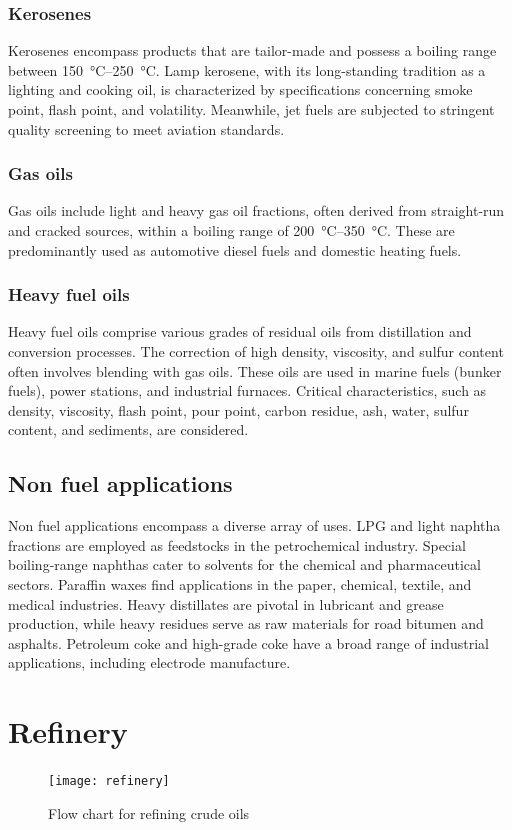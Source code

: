 \subsubsection{Kerosenes}
Kerosenes encompass products that are tailor-made and possess a boiling range between \SIrange{150}{250}{\celsius}.
Lamp kerosene, with its long-standing tradition as a lighting and cooking oil, is characterized by specifications concerning smoke point, flash point, and volatility.
Meanwhile, jet fuels are subjected to stringent quality screening to meet aviation standards.

\subsubsection{Gas oils}
Gas oils include light and heavy gas oil fractions, often derived from straight-run and cracked sources, within a boiling range of \SIrange{200}{350}{\celsius}.
These are predominantly used as automotive diesel fuels and domestic heating fuels.

\subsubsection{Heavy fuel oils}
Heavy fuel oils comprise various grades of residual oils from distillation and conversion processes.
The correction of high density, viscosity, and sulfur content often involves blending with gas oils.
These oils are used in marine fuels (bunker fuels), power stations, and industrial furnaces.
Critical characteristics, such as density, viscosity, flash point, pour point, carbon residue, ash, water, sulfur content, and sediments, are considered.

\subsection{Non fuel applications}
Non fuel applications encompass a diverse array of uses.
LPG and light naphtha fractions are employed as feedstocks in the petrochemical industry.
Special boiling-range naphthas cater to solvents for the chemical and pharmaceutical sectors.
Paraffin waxes find applications in the paper, chemical, textile, and medical industries.
Heavy distillates are pivotal in lubricant and grease production, while heavy residues serve as raw materials for road bitumen and asphalts.
Petroleum coke and high-grade coke have a broad range of industrial applications, including electrode manufacture.

\section{Refinery}
%
\begin{figure}[H]
    \centering
    \texttt{[image: refinery]}
    \caption{Flow chart for refining crude oils}
    \label{fig:refinery}
\end{figure}

